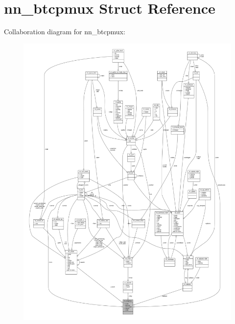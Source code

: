 \hypertarget{structnn__btcpmux}{}\section{nn\+\_\+btcpmux Struct Reference}
\label{structnn__btcpmux}


Collaboration diagram for nn\+\_\+btcpmux\+:\nopagebreak
\begin{figure}[H]
\begin{center}
\leavevmode
\includegraphics[width=350pt]{structnn__btcpmux__coll__graph}
\end{center}
\end{figure}
